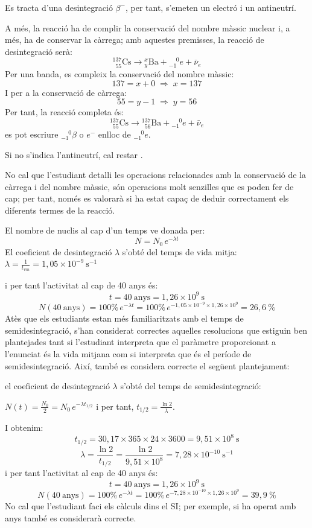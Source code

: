 \begin{solapartat}
 Es tracta d'una desintegració $\beta^-$, per tant, s'emeten un electró i un antineutrí.

A més, la reacció ha de complir la conservació del nombre màssic nuclear i, a més, ha de conservar la càrrega; amb aquestes premisses, la reacció de desintegració serà:
\[ {}^{137}_{\phantom{1}55}\mathrm{Cs} \to {}^{x}_{y}\mathrm{Ba} + {}^{\phantom{-}0}_{-1}e + \bar{\nu}_e \]
Per una banda, es compleix la conservació del nombre màssic:
\[ 137 = x + 0 \;\Rightarrow\; x = 137 \]
I per a la conservació de càrrega:
\[ 55 = y - 1 \;\Rightarrow\; y = 56 \]
Per tant, la reacció completa és:
\[ {}^{137}_{\phantom{1}55}\mathrm{Cs} \to {}^{137}_{\phantom{1}56}\mathrm{Ba} + {}^{\phantom{-}0}_{-1}e + \bar{\nu}_e \]
 es pot escriure ${}^{\phantom{-}0}_{-1}\beta$ o $e^-$ enlloc de ${}^{\phantom{-}0}_{-1}e$.

Si no s'indica l'antineutrí, cal restar .

No cal que l'estudiant detalli les operacions relacionades amb la conservació de la càrrega i del nombre màssic, són operacions molt senzilles que es poden fer de cap; per tant, només es valorarà si ha estat capaç de deduir correctament els diferents termes de la reacció.

\medskip
{} El nombre de nuclis al cap d'un temps ve donada per:
\[ N = N_0\,e^{-\lambda t} \]
El coeficient de desintegració $\lambda$ s'obté del temps de vida mitja: $\lambda = \frac{1}{t_{vm}} = 1,05\times 10^{-9}\ \mathrm{s^{-1}}$

 i per tant l'activitat al cap de 40 anys és:
\[ t = 40\ \text{anys} = 1,26\times 10^{9}\ \mathrm{s} \]
\[ N(40\ \text{anys}) = 100\%\,e^{-\lambda t} = 100\%\,e^{-1,05\times 10^{-9}\times 1,26\times 10^{9}} = 26,6\ \% \]
 Atès que els estudiants estan més familiaritzats amb el temps de semidesintegració, s'han considerat correctes aquelles resolucions que estiguin ben plantejades tant si l'estudiant interpreta que el paràmetre proporcionat a l'enunciat és la vida mitjana com si interpreta que és el període de semidesintegració. Així, també es considera correcte el següent plantejament:

el coeficient de desintegració $\lambda$ s'obté del temps de semidesintegració:

$N(t) = \frac{N_0}{2} = N_0\,e^{-\lambda t_{1/2}}$ i per tant, $t_{1/2} = \frac{\ln 2}{\lambda}$.

I obtenim:
\[ t_{1/2} = 30,17\times 365\times 24\times 3600 = 9,51\times 10^{8}\ \mathrm{s} \]
\[ \lambda = \frac{\ln 2}{t_{1/2}} = \frac{\ln 2}{9,51\times 10^{8}} = 7,28\times 10^{-10}\ \mathrm{s^{-1}} \]
 i per tant l'activitat al cap de 40 anys és:
\[ t = 40\ \text{anys} = 1,26\times 10^{9}\ \mathrm{s} \]
\[ N(40\ \text{anys}) = 100\%\,e^{-\lambda t} = 100\%\,e^{-7,28\times 10^{-10}\times 1,26\times 10^{9}} = 39,9\ \% \]
No cal que l'estudiant faci els càlculs dins el SI; per exemple, si ha operat amb anys també es considerarà correcte.
\end{solapartat}

